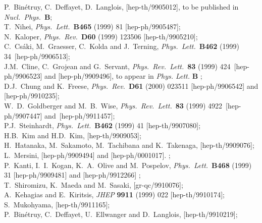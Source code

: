 \documentclass[a4paper,12pt]{article}
\begin{document}
\begin{thebibliography}{99}
P.\ Bin\'etruy, C.\ Deffayet, D.\ Langlois, [hep-th/9905012],
to be published in {\it Nucl.~Phys.}~{\bf B};\\
%
T.~Nihei,
{\it Phys.\ Lett.}\  {\bf B465} (1999) 81
[hep-ph/9905487];\\
%
N.~Kaloper,
{\it Phys.\ Rev.}\  {\bf D60} (1999) 123506
[hep-th/9905210];\\
%
C.~Cs\'aki, M.~Graesser, C.~Kolda and J.~Terning,
{\it Phys.\ Lett.}\  {\bf B462} (1999) 34~[hep-ph/9906513];\\
%
J.M.~Cline, C.~Grojean and G.~Servant,
{\it Phys.\ Rev.\ Lett.}\  {\bf 83} (1999) 424~[hep-ph/9906523]
and
[hep-ph/9909496], to appear in {\it Phys. Lett. } {\bf B} ;\\
%
D.J.~Chung and K.~Freese,
{\it Phys.\ Rev.}\  {\bf D61} (2000) 023511
[hep-ph/9906542]
and
[hep-ph/9910235];\\
%
W.~D.~Goldberger and M.~B.~Wise,
{\it Phys.\ Rev.\ Lett.}\  {\bf 83} (1999) 4922~[hep-ph/9907447]
and~[hep-ph/9911457];\\
%
P.J.~Steinhardt,
{\it Phys.\ Lett.}\  {\bf B462} (1999) 41
[hep-th/9907080];\\
%
H.B.~Kim and H.D.~Kim,
[hep-th/9909053];\\
%
H.~Hatanaka, M.~Sakamoto, M.~Tachibana and K.~Takenaga,
[hep-th/9909076];\\
%
L.~Mersini,
[hep-ph/9909494]
and
[hep-ph/0001017].
;\\
%
P.~Kanti, I.~I.~Kogan, K.~A.~Olive and M.~Pospelov,
{\it Phys.\ Lett.}\  {\bf B468} (1999) 31
[hep-ph/9909481]
and
[hep-ph/9912266] ;\\
%
T.~Shiromizu, K.~Maeda and M.~Sasaki,
[gr-qc/9910076];\\
%
A.~Kehagias and E.~Kiritsis,
{\it JHEP} {\bf 9911} (1999) 022
[hep-th/9910174];\\
%
S.~Mukohyama,
[hep-th/9911165];\\
%
P.~Bin\'etruy, C.~Deffayet, U.~Ellwanger and D.~Langlois,
[hep-th/9910219];\\

\end{thebibliography}
\end{document}
